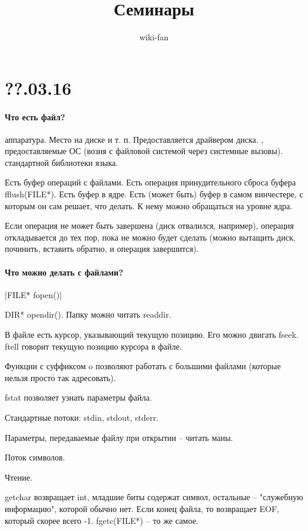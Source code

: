 \documentclass[a4paper,10pt]{article}
\author{wiki-fan}
\title{\textbf{Семинары}}
\newcommand{\cl}{\mint{c}}
\begin{document}
\maketitle

\section{??.03.16}

\paragraph{Что есть файл?}

\begin{enumerate}
 аппаратура. Место на диске и т. п. Предоставляется драйвером диска.
, предоставляемые ОС (возня с файловой системой через системные вызовы).
 стандартной библиотеки языка.
\end{enumerate}
Есть буфер операций с файлами. Есть операция принудительного сброса буфера fflush(FILE*). Есть буфер в ядре. Есть (может быть) буфер в самом винчестере, с которым он сам решает, что делать. К нему можно обращаться на уровне ядра.

Если операция не может быть завершена (диск отвалился, например), операция откладывается до тех пор, пока не можно будет сделать (можно вытащить диск, починить, вставить обратно, и операция завершится).


\paragraph{Что можно делать с файлами?}

\cl|FILE* fopen()|

DIR* opendir(). Папку можно читать readdir.

В файле есть курсор, указывающий текущую позицию. Его можно двигать fseek. ftell говорит текущую позицию курсора в файле.

Функции с суффиксом o позволяют работать с большими файлами (которые нельзя просто так адресовать).

fstat позволяет узнать параметры файла.

Стандартные потоки: stdin, stdout, stderr.

Параметры, передаваемые файлу при открытии -- читать маны.

Поток символов.

Чтение. 

getchar возвращает int, младшие биты содержат символ, остальные -- "служебную информацию", которой обычно нет. Если конец файла, то возвращает EOF, который скорее всего -1. fgetc(FILE*) -- то же самое.
\end{document}
